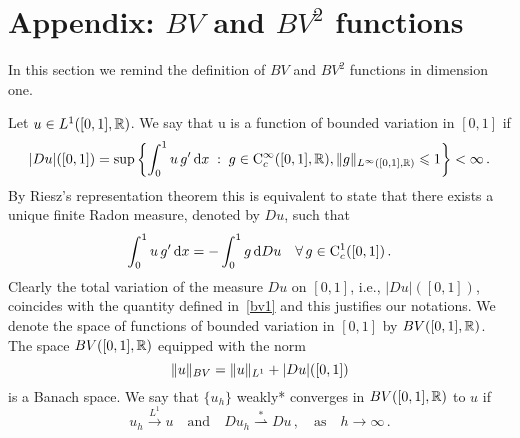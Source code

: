 
\section{Appendix: $BV$ and $BV^2$ functions}\label{appendix}

In this section we remind the definition of $BV$ and $BV^2$ functions in dimension one.

\begin{defn}
 Let $u\in L^1([0,1],\mathbb{R})$. We say that u is a function of bounded variation in $[0,1]$ if
\begin{equation}\label{bv1}
|D u|([0,1])=\sup \left\{ 
 	\int_0^1u\,g'\, \mathrm{d} x 
	 \;:\; 
		g\in \mathrm{C}^\infty_c([0,1],\mathbb{R}),\|g\|_{L^\infty([0,1],\mathbb{R})}\leqslant 1
	 \right\}< \infty\,.
\end{equation}
By  Riesz's representation theorem this is equivalent to state that there exists a unique finite Radon measure, denoted by $D u$, such that 
$$\int_0^1u\,g'\, \mathrm{d} x = - \int_0^1g\, \mathrm{d} D u \quad \forall \, g\in \mathrm{C}^1_c({[0,1]})\,.$$
Clearly the total variation of the measure $D u$ on $[0,1]$, i.e., $|D u|([0,1])$, coincides with the quantity defined in~\eqref{bv1} and this justifies our notations. 
We denote the space of functions of bounded variation in $[0,1]$ by $BV([0,1],\mathbb{R})$. 
The space $BV([0,1],\mathbb{R})$ equipped with the norm 
$$\|u\|_{BV} = \|u\|_{L^1} + |D u |([0,1])$$
is a Banach space. We say that $\{u_h\}$  weakly* converges in $BV([0,1],\mathbb{R})$ to $u$ if
$$u_h \overset{L^1}{\longrightarrow} u \quad\mbox{and}\quad D u_h \overset{*}{\rightharpoonup}D u\,, \quad\mbox{as}\quad h \rightarrow \infty\,.$$
\end{defn}

